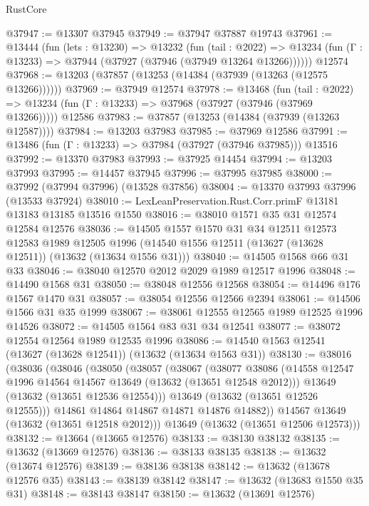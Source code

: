 \begin{lexlean}{RustCore}
\begin{coremodule}
@37947 := @13307 @37945
@37949 := @37947 @37887 @19743
@37961 := @13444
    (fun (lets : @13230) =>
    @13232
      (fun (tail : @2022) =>
      @13234 (fun (Γ : @13233) => @37944 (@37927 (@37946 (@37949 @13264 @13266))))))
    @12574
@37968 := @13203 (@37857 (@13253 (@14384 (@37939 (@13263 (@12575 @13266))))))
@37969 := @37949 @12574
@37978 := @13468
    (fun (tail : @2022) => @13234 (fun (Γ : @13233) => @37968 (@37927 (@37946 (@37969 @13266)))))
    @12586
@37983 := @37857 (@13253 (@14384 (@37939 (@13263 @12587))))
@37984 := @13203 @37983
@37985 := @37969 @12586
@37991 := @13486 (fun (Γ : @13233) => @37984 (@37927 (@37946 @37985))) @13516
@37992 := @13370 @37983
@37993 := @37925 @14454
@37994 := @13203 @37993
@37995 := @14457 @37945
@37996 := @37995 @37985
@38000 := @37992 (@37994 @37996) (@13528 @37856)
@38004 := @13370 @37993 @37996 (@13533 @37924)
@38010 := LexLeanPreservation.Rust.Corr.primF @13181 @13183 @13185 @13516 @1550
@38016 := @38010 @1571 @35 @31 @12574 @12584 @12576
@38036 := @14505
    @1557
    @1570
    @31
    @34
    @12511
    @12573
    @12583
    @1989
    @12505
    @1996
    (@14540 @1556 @12511 (@13627 (@13628 @12511)) (@13632 (@13634 @1556 @31)))
@38040 := @14505 @1568 @66 @31 @33
@38046 := @38040 @12570 @2012 @2029 @1989 @12517 @1996
@38048 := @14490 @1568 @31
@38050 := @38048 @12556 @12568
@38054 := @14496 @176 @1567 @1470 @31
@38057 := @38054 @12556 @12566 @2394
@38061 := @14506 @1566 @31 @35 @1999
@38067 := @38061 @12555 @12565 @1989 @12525 @1996 @14526
@38072 := @14505 @1564 @83 @31 @34 @12541
@38077 := @38072 @12554 @12564 @1989 @12535 @1996
@38086 := @14540 @1563 @12541 (@13627 (@13628 @12541)) (@13632 (@13634 @1563 @31))
@38130 := @38016
    (@38036
      (@38046
        (@38050
          (@38057
            (@38067
              (@38077
                @38086
                (@14558 @12547 @1996 @14564 @14567 @13649 (@13632 (@13651 @12548 @2012)))
                @13649
                (@13632 (@13651 @12536 @12554)))
              @13649
              (@13632 (@13651 @12526 @12555)))
            @14861
            @14864
            @14867
            @14871
            @14876
            @14882))
        @14567
        @13649
        (@13632 (@13651 @12518 @2012)))
      @13649
      (@13632 (@13651 @12506 @12573)))
@38132 := @13664 (@13665 @12576)
@38133 := @38130 @38132
@38135 := @13632 (@13669 @12576)
@38136 := @38133 @38135
@38138 := @13632 (@13674 @12576)
@38139 := @38136 @38138
@38142 := @13632 (@13678 @12576 @35)
@38143 := @38139 @38142
@38147 := @13632 (@13683 @1550 @35 @31)
@38148 := @38143 @38147
@38150 := @13632 (@13691 @12576)

\end{coremodule}
\end{lexlean}
